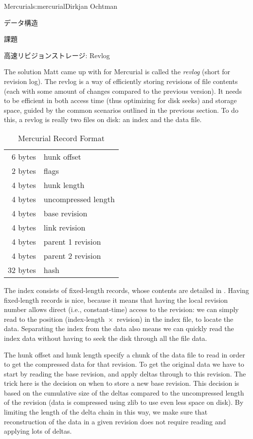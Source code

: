 \begin{aosachapter}{Mercurial}{s:mercurial}{Dirkjan Ochtman}
\begin{aosasect1}{データ構造}
\begin{aosasect2}{課題}
\end{aosasect2}

\begin{aosasect2}{高速リビジョンストレージ: Revlog}

The solution Matt came up with for Mercurial is called the \emph{revlog}
(short for revision log). The revlog is a way of efficiently storing
revisions of file contents (each with some amount of changes compared
to the previous version). It needs to be efficient in both access time
(thus optimizing for disk seeks) and storage space, guided by the common
scenarios outlined in the previous section. To do this, a revlog is
really two files on disk: an index and the data file.

\begin{table}[h!]
  \centering
  \begin{tabular}{|rl|}
    \hline
    6 bytes & hunk offset \\
    2 bytes & flags \\
    4 bytes & hunk length \\
    4 bytes & uncompressed length \\
    4 bytes & base revision \\
    4 bytes & link revision \\
    4 bytes & parent 1 revision \\
    4 bytes & parent 2 revision \\
    32 bytes & hash \\
    \hline
  \end{tabular}
  \caption{Mercurial Record Format}
  \label{tbl.hg.records}
\end{table}

The index consists of fixed-length records, whose contents are
detailed in . Having fixed-length records
is nice, because it means that having the local revision number allows
direct (i.e., constant-time) access to the revision: we can simply
read to the position (index-length~$\times$~revision) in the index
file, to locate the data. Separating the index from the data also
means we can quickly read the index data without having to seek the
disk through all the file data.

The hunk offset and hunk length specify a chunk of the data file to
read in order to get the compressed data for that revision. To get the
original data we have to start by reading the base revision, and apply
deltas through to this revision. The trick here is the decision on
when to store a new base revision. This decision is based on the
cumulative size of the deltas compared to the uncompressed length of
the revision (data is compressed using zlib to use even less space on
disk). By limiting the length of the delta chain in this way, we make
sure that reconstruction of the data in a given revision does not
require reading and applying lots of deltas.


\end{aosasect2}
\end{aosasect1}
\end{aosachapter}
